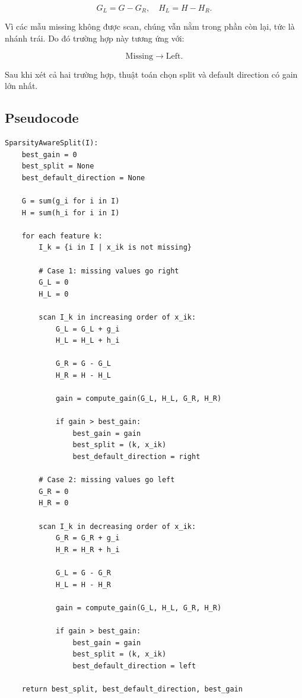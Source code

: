 \[
G_L = G - G_R,
\quad
H_L = H - H_R.
\]

Vì các mẫu missing không được scan, chúng vẫn nằm trong phần còn lại, tức là nhánh trái. Do đó trường hợp này tương ứng với:

\[
\text{Missing} \rightarrow \text{Left}.
\]

Sau khi xét cả hai trường hợp, thuật toán chọn split và default direction có gain lớn nhất.

\subsection{Pseudocode}

\begin{lstlisting}[style=pseudocode, caption={Sparsity-aware Split Finding}, label={lst:sparsity_aware_split}]
SparsityAwareSplit(I):
    best_gain = 0
    best_split = None
    best_default_direction = None

    G = sum(g_i for i in I)
    H = sum(h_i for i in I)

    for each feature k:
        I_k = {i in I | x_ik is not missing}

        # Case 1: missing values go right
        G_L = 0
        H_L = 0

        scan I_k in increasing order of x_ik:
            G_L = G_L + g_i
            H_L = H_L + h_i

            G_R = G - G_L
            H_R = H - H_L

            gain = compute_gain(G_L, H_L, G_R, H_R)

            if gain > best_gain:
                best_gain = gain
                best_split = (k, x_ik)
                best_default_direction = right

        # Case 2: missing values go left
        G_R = 0
        H_R = 0

        scan I_k in decreasing order of x_ik:
            G_R = G_R + g_i
            H_R = H_R + h_i

            G_L = G - G_R
            H_L = H - H_R

            gain = compute_gain(G_L, H_L, G_R, H_R)

            if gain > best_gain:
                best_gain = gain
                best_split = (k, x_ik)
                best_default_direction = left

    return best_split, best_default_direction, best_gain
\end{lstlisting}

